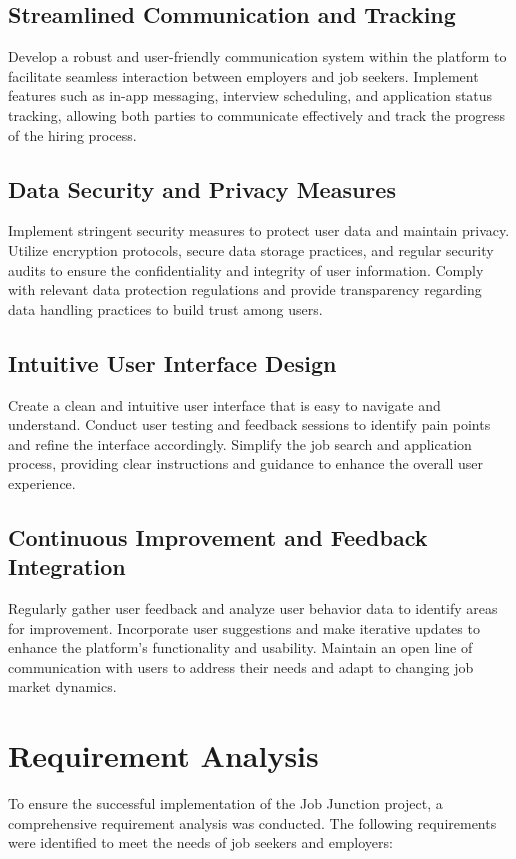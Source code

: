 \documentclass[a4paper,11pt]{report}
\begin{document}
\section{Streamlined Communication and Tracking}
 Develop a robust and user-friendly communication system
within the platform to facilitate seamless interaction between employers and job seekers. Implement
features such as in-app messaging, interview scheduling, and application status tracking, allowing both
parties to communicate effectively and track the progress of the hiring process.
\section{Data Security and Privacy Measures}
Implement stringent security measures to protect user data and
maintain privacy. Utilize encryption protocols, secure data storage practices, and regular security audits
to ensure the confidentiality and integrity of user information. Comply with relevant data protection
regulations and provide transparency regarding data handling practices to build trust among users.

\section{Intuitive User Interface Design}
Create a clean and intuitive user interface that is easy to navigate and
understand. Conduct user testing and feedback sessions to identify pain points and refine the interface
accordingly. Simplify the job search and application process, providing clear instructions and guidance to
enhance the overall user experience.
\section{ Continuous Improvement and Feedback Integration}
Regularly gather user feedback and analyze user
behavior data to identify areas for improvement. Incorporate user suggestions and make iterative
updates to enhance the platform's functionality and usability. Maintain an open line of communication
with users to address their needs and adapt to changing job market dynamics.

\chapter{Requirement Analysis}
To ensure the successful implementation of the Job Junction project, a comprehensive requirement
analysis was conducted. The following requirements were identified to meet the needs of job seekers
and employers:
\end{document}
